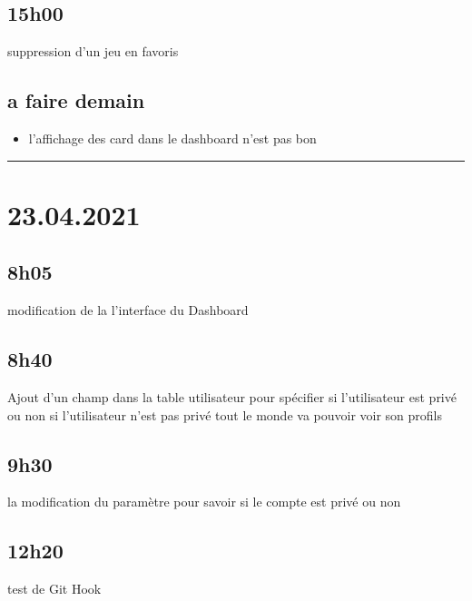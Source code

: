 \documentclass[a4paper,12pt,french]{sphinxmanual}
\begin{document}
\subsection{15h00}
\label{\detokenize{logbook:id18}}
\sphinxAtStartPar
suppression d’un jeu en favoris


\subsection{a faire demain}
\label{\detokenize{logbook:a-faire-demain}}\begin{itemize}
\item {} 
\sphinxAtStartPar
l’affichage des card dans le dashboard n’est pas bon

\end{itemize}


\bigskip\hrule\bigskip



\section{23.04.2021}
\label{\detokenize{logbook:id19}}

\subsection{8h05}
\label{\detokenize{logbook:id20}}
\sphinxAtStartPar
modification de la l’interface du Dashboard


\subsection{8h40}
\label{\detokenize{logbook:id21}}
\sphinxAtStartPar
Ajout d’un champ dans la table utilisateur pour spécifier si l’utilisateur est privé ou non
si l’utilisateur n’est pas privé tout le monde va pouvoir voir son profils


\subsection{9h30}
\label{\detokenize{logbook:id22}}
\sphinxAtStartPar
la modification du paramètre pour savoir si le compte est privé ou non


\subsection{12h20}
\label{\detokenize{logbook:id23}}
\sphinxAtStartPar
test de Git Hook
\end{document}
